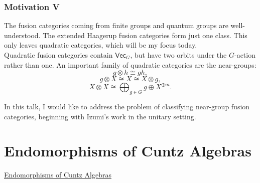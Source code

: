 \documentclass{beamer}
\newcommand{\textcat}[1]{\mathrm{\textsf{#1}}}
\begin{document}
\begin{frame}
\frametitle{Motivation V}
The fusion categories coming from finite groups and quantum groups are well-understood. The extended Haagerup fusion categories form just one class. This only leaves \textcolor{structure}{quadratic categories}, which will be my focus today.\pause\\[2ex]

\textcolor{structure}{Quadratic fusion categories} contain $\textcat{Vec}_G$, but have two orbits under the $G$-action rather than one. An important family of quadratic categories are the \textcolor{structure}{near-groups}:%
\[
g \otimes h \cong gh,
\]
\[
g \otimes X \cong X \cong X \otimes g,
\]
\[
X \otimes X \cong \bigoplus_{g \in G}g \oplus X^{\oplus m}.
\]\pause

In this talk, I would like to address the problem of classifying \textcolor{structure}{near-group fusion categories}, beginning with Izumi's work in the unitary setting.
\end{frame}


\section{Endomorphisms of Cuntz Algebras}

\begin{frame}
\noindent\centerline{\LARGE\textcolor{structure}{\underline{Endomorphisms of Cuntz Algebras}}}
\end{frame}

\end{document}
